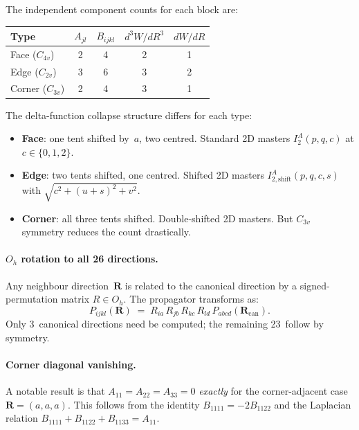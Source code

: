 \documentclass[11pt,a4paper]{article}
\newcommand{\bR}{\bm{R}}
\theoremstyle{plain}
\theoremstyle{remark}
\begin{document}
The independent component counts for each block are:

\begin{center}
\begin{tabular}{l*{4}{c}}
\toprule
Type & $A_{jl}$ & $B_{ijkl}$ & $d^3W/dR^3$ & $dW/dR$ \\
\midrule
Face ($C_{4v}$) & 2 & 4 & 2 & 1 \\
Edge ($C_{2v}$) & 3 & 6 & 3 & 2 \\
Corner ($C_{3v}$) & 2 & 4 & 3 & 1 \\
\bottomrule
\end{tabular}
\end{center}

The delta-function collapse structure differs for each type:
\begin{itemize}[nosep]
  \item \textbf{Face}: one tent shifted by~$a$, two centred.
    Standard 2D masters $I^A_2(p,q,c)$ at $c\in\{0,1,2\}$.
  \item \textbf{Edge}: two tents shifted, one centred.
    Shifted 2D masters
    $I^A_{2,\mathrm{shift}}(p,q,c,s)$ with $\sqrt{c^2+(u+s)^2+v^2}$.
  \item \textbf{Corner}: all three tents shifted.
    Double-shifted 2D masters.  But $C_{3v}$ symmetry reduces the
    count drastically.
\end{itemize}

\paragraph{$O_h$ rotation to all 26 directions.}
Any neighbour direction~$\bR$ is related to the canonical direction
by a signed-permutation matrix $R \in O_h$.  The propagator
transforms as:
\begin{equation}
  P_{ijkl}(\bR) \;=\;
  R_{ia}\,R_{jb}\,R_{kc}\,R_{ld}\,
  P_{abcd}(\bR_{\mathrm{can}}).
  \label{eq:Oh-rotation}
\end{equation}
Only 3~canonical directions need be computed; the remaining
23~follow by symmetry.

\paragraph{Corner diagonal vanishing.}
A notable result is that $A_{11} = A_{22} = A_{33} = 0$
\emph{exactly} for the corner-adjacent case $\bR = (a,a,a)$.
This follows from the identity $B_{1111} = -2B_{1122}$
and the Laplacian relation $B_{1111} + B_{1122} + B_{1133} = A_{11}$.
\end{document}
